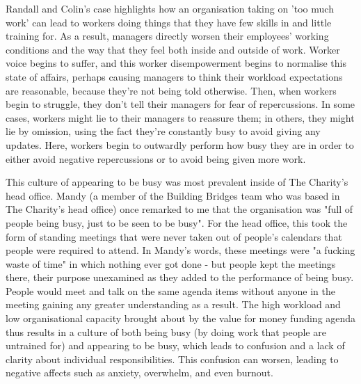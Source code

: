 Randall and Colin's case highlights how an organisation taking on 'too much work' can lead to workers doing things that they have few skills in and little training for. As a result, managers directly worsen their employees' working conditions and the way that they feel both inside and outside of work. Worker voice begins to suffer, and this worker disempowerment begins to normalise this state of affairs, perhaps causing managers to think their workload expectations are reasonable, because they're not being told otherwise. Then, when workers begin to struggle, they don't tell their managers for fear of repercussions. In some cases, workers might lie to their managers to reassure them; in others, they might lie by omission, using the fact they're constantly busy to avoid giving any updates. Here, workers begin to outwardly perform how busy they are in order to either avoid negative repercussions or to avoid being given more work. 

This culture of appearing to be busy was most prevalent inside of The Charity’s head office. Mandy (a member of the Building Bridges team who was based in The Charity's head office) once remarked to me that the organisation was "full of people being busy, just to be seen to be busy". For the head office, this took the form of standing meetings that were never taken out of people's calendars that people were required to attend. In Mandy's words, these meetings were "a fucking waste of time" in which nothing ever got done - but people kept the meetings there, their purpose unexamined as they added to the performance of being busy. People would meet and talk on the same agenda items without anyone in the meeting gaining any greater understanding as a result. The high workload and low organisational capacity brought about by the value for money funding agenda thus results in a culture of both being busy (by doing work that people are untrained for) and appearing to be busy, which leads to confusion and a lack of clarity about individual responsibilities. This confusion can worsen, leading to negative affects such as anxiety, overwhelm, and even burnout. 

